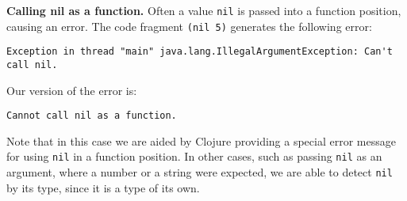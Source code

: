 \documentclass[submission,copyright,creativecommons]{eptcs}
\newcommand{\allcomments}[1]{{#1}}
\newcommand{\emcomment}[1]{{\bf \textcolor{ForestGreen}{\allcomments{{#1}}}}}
\newcommand{\hfcomment}[1]{\textcolor{Teal}{\allcomments{Henry: {#1}}}}
\begin{document}
{\bf Calling nil as a function.} Often a value {\tt nil} is passed into a function position, causing an error. 
The code fragment {\tt (nil 5)} generates the following error: 
\begin{verbatim}
Exception in thread "main" java.lang.IllegalArgumentException: Can't call nil. 
\end{verbatim}
Our version of the error is:
\begin{verbatim}
Cannot call nil as a function.
\end{verbatim}
Note that in this case we are aided by Clojure providing a special error message for using {\tt nil} in a function position. In other cases, 
such as passing {\tt nil} as an argument, where a number or a string were expected, we are able to detect {\tt nil} by its type, since it is
a type of its own.  

%
%
% 
%
% 
\end{document}
